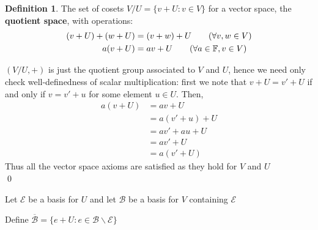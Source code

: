 \documentclass[11pt, a4paper]{report}
\makeatletter
\numberwithin{equation}{section}
\newcommand{\bk}{\backslash}
\newcommand{\F}{\mathbb{F}}
\numberwithin{equation}{subsection}
\theoremstyle{plain}
\theoremstyle{definition}
\newtheorem{defn}{Definition}[chapter]
\theoremstyle{remark}
\newtheorem*{prf}{Proof}
\renewenvironment{prf}[1][\proofname]{\par
  \vspace{-\topsep}%
  \normalfont
  \topsep0pt \partopsep0pt %
  \trivlist
  \item[\hskip\labelsep
        \itshape
    #1\@addpunct{.}]\ignorespaces
}{%
  \popQED\endtrivlist\@endpefalse
  \addvspace{6pt plus 6pt} %
}
\newcommand{\pr}[1]{\begin{adjustwidth}{1cm}{} \begin{prf} #1 \end{prf} \end{adjustwidth}}
\makeatother
\begin{document}
\begin{defn} The set of cosets $V/U = \{ v + U : v \in V \}$ for a vector space, the \textbf{quotient space}, with operations:
\begin{align*}
(v + U) + (w + U) &= (v + w) + U\tag{$\forall v,w \in V$}\\
a ( v + U ) &= av + U \tag{$\forall a \in \F, v \in V$}
\end{align*}\end{defn}
\pr{
$( V/U, +)$ is just the quotient group associated to $V$ and $U$, hence we need only check well-definedness of scalar multiplication: first we note that $v + U = v' + U$ if and only if $v = v' + u$ for some element $u \in U$. Then,
\begin{align*}
a(v+ U) 	&= av + U\\
			&= a(v' + u) + U\\
			&= av' + au + U\\
			&= av' + U \tag{since $U$ is a vector space it is closed under linear multipication}\\
			&= a(v' + U)				 
\end{align*}
Thus all the vector space axioms are satisfied as they hold for $V$ and $U$ \\[-8pt]\qed
}
\newpage 
Let $\mathcal{E}$ be a basis for $U$ and let $\mathcal{B}$ be a basis for $V$ containing $\mathcal{E}$

Define $\overline{\mathcal{B}} = \{ e + U : e \in \mathcal{B} \bk \mathcal{E}\}$
\end{document}
